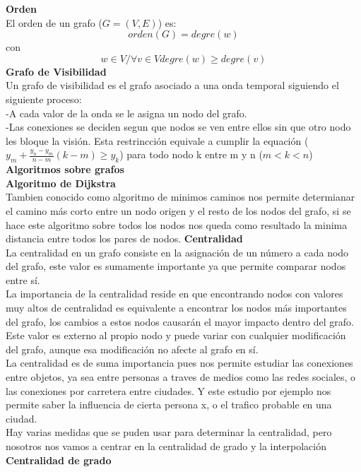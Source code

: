 \documentclass[12pt, letterpaper, twoside]{article}
\begin{document}
			{\textbf{Orden}}\\
			El orden de un grafo ($G = (V,E)$) es:
			\[orden(G)= degre(w)\]
			con\\
			\[ w\in V / \forall v\in V      degre(w) \geq  degre(v)  \]
			{\textbf{Grafo de Visibilidad}}\\
			Un grafo de visibilidad es el grafo asociado a una onda temporal siguiendo el siguiente proceso:\\
			-A cada valor de la onda se le asigna un nodo del grafo.\\
			-Las conexiones se deciden segun que nodos se ven entre ellos sin que otro nodo les bloque la visión. Esta restrincción equivale a cumplir la equación ($y_m + \frac{y_n-y_m}{n-m}(k-m) \geq y_k$) para todo nodo k entre m y n ($ m < k < n$)\\
		{\textbf{Algoritmos sobre grafos}}\\
		{\textbf{Algoritmo de Dijkstra}}\\
		Tambien conocido como algoritmo de minimos caminos nos permite determianar el camino más corto entre un nodo origen y el resto de los nodos del grafo, si se hace este algoritmo sobre todos los nodos nos queda como resultado la minima distancia entre todos los pares de nodos.
		{\textbf{Centralidad}}\\
			La centralidad en un grafo consiste en la asignación de un número a cada nodo del grafo, este valor es sumamente importante ya que permite comparar nodos entre sí.\\
			La importancia de la centralidad reside en que encontrando nodos con valores muy altos de centralidad es equivalente a encontrar los nodos más importantes del grafo, los cambios a estos nodos causarán el mayor impacto dentro del grafo. Este valor es externo al propio nodo y puede variar con cualquier modificación del grafo, aunque esa modificación no afecte al grafo en sí.\\
			La centralidad es de suma importancia pues nos permite estudiar las conexiones entre objetos, ya sea entre personas a traves de medios como las redes sociales, o las conexiones por carretera entre ciudades. Y este estudio por ejemplo nos permite saber la influencia de cierta persona x, o el trafico probable en una ciudad.\\
			Hay varias medidas que se puden usar para determinar la centralidad, pero nosotros nos vamos a centrar en la centralidad de grado y la interpolación\\
			{\textbf{Centralidad de grado}}\\
\end{document}
